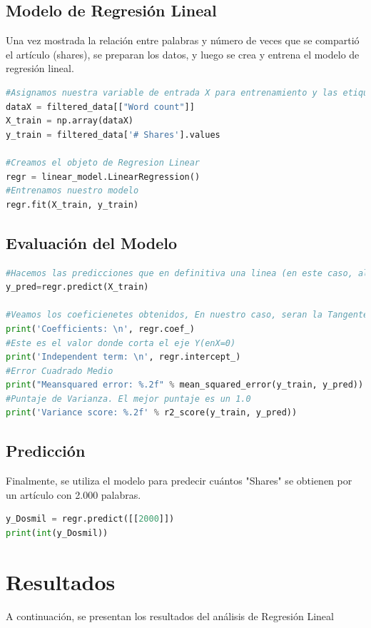 \documentclass{article}
\begin{document}
\subsection{Modelo de Regresión Lineal}Una vez mostrada la relación entre palabras y número de veces que se compartió el artículo (shares), se preparan los datos, y luego se crea y entrena el modelo de regresión lineal.
\begin{lstlisting}[language=Python]
#Asignamos nuestra variable de entrada X para entrenamiento y las etiquetas Y
dataX = filtered_data[["Word count"]]
X_train = np.array(dataX)
y_train = filtered_data['# Shares'].values

#Creamos el objeto de Regresion Linear
regr = linear_model.LinearRegression()
#Entrenamos nuestro modelo
regr.fit(X_train, y_train)
\end{lstlisting}

\subsection{Evaluación del Modelo}
\begin{lstlisting}[language=Python]
#Hacemos las predicciones que en definitiva una linea (en este caso, al ser 2D)
y_pred=regr.predict(X_train)

#Veamos los coeficienetes obtenidos, En nuestro caso, seran la Tangente
print('Coefficients: \n', regr.coef_)
#Este es el valor donde corta el eje Y(enX=0)
print('Independent term: \n', regr.intercept_)
#Error Cuadrado Medio
print("Meansquared error: %.2f" % mean_squared_error(y_train, y_pred))
#Puntaje de Varianza. El mejor puntaje es un 1.0
print('Variance score: %.2f' % r2_score(y_train, y_pred))
\end{lstlisting}

\subsection{Predicción} Finalmente, se utiliza el modelo para predecir cuántos "Shares" se obtienen por un artículo con 2.000 palabras.
\begin{lstlisting}[language=Python]
y_Dosmil = regr.predict([[2000]])
print(int(y_Dosmil))
\end{lstlisting}

\newpage
\section{Resultados}
A continuación, se presentan los resultados del análisis de Regresión Lineal\\
\end{document}
